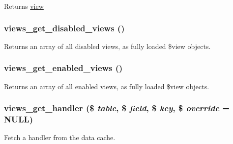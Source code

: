 \begin{DoxyReturn}{Returns}
\hyperlink{classview}{view} 
\end{DoxyReturn}
\hypertarget{views_8module_aa1fc003dbf7d8e16d0b3861be577afc4}{
\subsubsection[{views\_\-get\_\-disabled\_\-views}]{\setlength{\rightskip}{0pt plus 5cm}views\_\-get\_\-disabled\_\-views ()}}
\label{views_8module_aa1fc003dbf7d8e16d0b3861be577afc4}
Returns an array of all disabled views, as fully loaded \$view objects. \hypertarget{views_8module_a8c21a5392230ac4dce7091e5031f3c93}{
\subsubsection[{views\_\-get\_\-enabled\_\-views}]{\setlength{\rightskip}{0pt plus 5cm}views\_\-get\_\-enabled\_\-views ()}}
\label{views_8module_a8c21a5392230ac4dce7091e5031f3c93}
Returns an array of all enabled views, as fully loaded \$view objects. \hypertarget{views_8module_a01ad2babd9f3cc6cc40e092a12267158}{
\subsubsection[{views\_\-get\_\-handler}]{\setlength{\rightskip}{0pt plus 5cm}views\_\-get\_\-handler (\$ {\em table}, \/  \$ {\em field}, \/  \$ {\em key}, \/  \$ {\em override} = {\ttfamily NULL})}}
\label{views_8module_a01ad2babd9f3cc6cc40e092a12267158}
Fetch a handler from the data cache.



